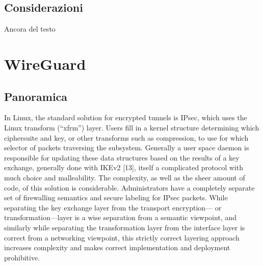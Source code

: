 \subsection{Considerazioni}
Ancora del testo

\section{WireGuard}
\subsection{Panoramica}
In Linux, the standard solution for encrypted tunnels is IPsec, which uses the Linux transform (“xfrm”) layer. Users fill in a kernel structure determining which ciphersuite and key, or other transforms such as compression, to use for which selector of packets traversing the subsystem. Generally a user space daemon is responsible for updating these data structures based on the results of a key exchange, generally done with IKEv2 [13], itself a complicated protocol with much choice and malleability. The complexity, as well as the sheer amount of code, of this solution is considerable. Administrators have a completely separate set of firewalling semantics and secure labeling for IPsec packets. While separating the key exchange layer from the transport encryption— or transformation—layer is a wise separation from a semantic viewpoint, and similarly while separating the transformation layer from the interface layer is correct from a networking viewpoint, this strictly correct layering approach increases complexity and makes correct implementation and deployment prohibitive.
